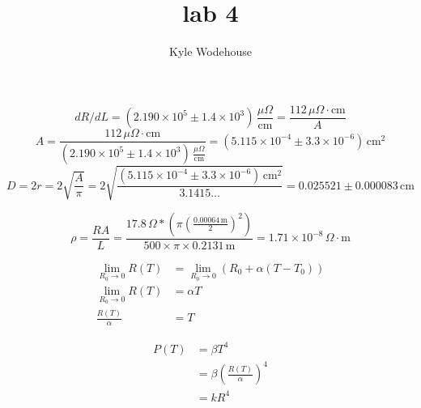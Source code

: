 \documentclass{article}
\title{\bfseries lab 4}
\author{Kyle Wodehouse}
\begin{document}
\maketitle

\[ dR/dL = \left(2.190\times 10^5 \pm 1.4\times10^3\right) \,\frac{\mu\Omega}{\text{cm}}  = \frac{112\,\mu \Omega \cdot \text{cm}}{A} \]
\[ A = \frac{112\,\mu \Omega \cdot \text{cm}}{\left(2.190\times 10^5 \pm 1.4\times10^3\right) \,\frac{\mu\Omega}{\text{cm}}} = \left(5.115\times 10^{-4} \pm 3.3\times10^{-6} \right)\,\text{cm}^2 \]
\[ D = 2r = 2\sqrt{\frac{A}{\pi}} = 2\sqrt{\frac{\left(5.115\times 10^{-4} \pm 3.3\times10^{-6}\right)\,\text{cm}^2}{3.1415\ldots}} = 0.025521 \pm 0.000083 \,\text{cm} \]

\vspace{2em}

\[
    \rho = \frac{RA}{L} = \frac{17.8\,\Omega * \left(\pi{\left(\frac{0.00064\,\text{m}}{2}\right)}^2\right)}{500 \times \pi \times 0.2131\,\text{m}} = 1.71 \times 10^{-8}\,\Omega\cdot\text{m}
\]

\vspace{2em}

\begin{align*}
  \lim_{R_0 \to 0} R(T) &= \lim_{R_0 \to 0} \left( R_0 + \alpha (T - T_0) \right) \\
  \lim_{R_0 \to 0} R(T) &= \alpha T \\
  \frac{R(T)}{\alpha} &= T
\end{align*}

\begin{align*}
  P(T) &= \beta T^4 \\
  &= \beta \left( \frac{R(T)}{\alpha} \right)^4 \\
  &= k R^4
\end{align*}
\end{document}
